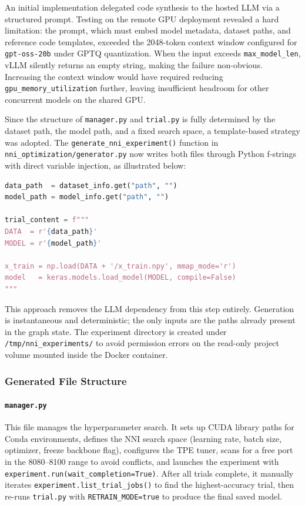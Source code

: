 An initial implementation delegated code synthesis to the hosted LLM via a structured prompt. Testing on the remote GPU deployment revealed a hard limitation: the prompt, which must embed model metadata, dataset paths, and reference code templates, exceeded the 2048-token context window configured for \texttt{gpt-oss-20b} under GPTQ quantization. When the input exceeds \texttt{max\_model\_len}, vLLM silently returns an empty string, making the failure non-obvious. Increasing the context window would have required reducing \texttt{gpu\_memory\_utilization} further, leaving insufficient headroom for other concurrent models on the shared GPU.

Since the structure of \texttt{manager.py} and \texttt{trial.py} is fully determined by the dataset path, the model path, and a fixed search space, a template-based strategy was adopted. The \texttt{generate\_\allowbreak nni\_\allowbreak experiment()} function in \allowbreak\texttt{nni\_optimization/\allowbreak generator.py} now writes both files through Python f-strings with direct variable injection, as illustrated below:

\begin{lstlisting}[language=Python, caption={Template-based path injection for the NNI trial script}, label={lst:nni_template}]
data_path  = dataset_info.get("path", "")
model_path = model_info.get("path", "")

trial_content = f"""
DATA  = r'{data_path}'
MODEL = r'{model_path}'

x_train = np.load(DATA + '/x_train.npy', mmap_mode='r')
model   = keras.models.load_model(MODEL, compile=False)
"""
\end{lstlisting}

This approach removes the LLM dependency from this step entirely. Generation is instantaneous and deterministic; the only inputs are the paths already present in the graph state. The experiment directory is created under \texttt{/tmp/nni\_experiments/} to avoid permission errors on the read-only project volume mounted inside the Docker container.

\subsubsection{Generated File Structure}

\paragraph{\texttt{manager.py}}
This file manages the hyperparameter search. It sets up CUDA library paths for Conda environments, defines the NNI search space (learning rate, batch size, optimizer, freeze backbone flag), configures the TPE tuner, scans for a free port in the 8080--8100 range to avoid conflicts, and launches the experiment with \texttt{experiment.run(wait\_completion=True)}. After all trials complete, it manually iterates \texttt{experiment.list\_\allowbreak trial\_\allowbreak jobs()} to find the highest-accuracy trial, then re-runs \texttt{trial.py} with \texttt{RETRAIN\_MODE=true} to produce the final saved model.

